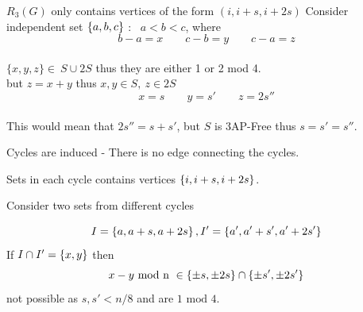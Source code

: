
\begin{frame}
    \begin{heading}{\(R_3(G)\) only contains vertices of the form \((i, i+s, i+2s)\)}
        Consider independent set \(\left\{ a,b,c \right\}\) : \ \(a<b<c\), where
        \[b-a=x \qquad c-b=y \qquad c-a=z\]\\
        \(\{x,y,z\} \in \ S \cup 2S\) thus they are either 1 or 2 mod 4.\\
        but \(z=x+y\) thus \(x,y \in S, \ z \in 2S\)  \\
        \pause
        \[x=s \qquad y=s' \qquad z=2s''\]\\
        This would mean that \(2s''=s+s'\), but \(S\) is 3AP-Free thus \(s=s'=s''\).
    \end{heading}
\end{frame}


\begin{frame}{}
\begin{heading}{Cycles are induced - There is no edge connecting the cycles.}

    Sets in each cycle contains vertices 
    \(\left\{ i,i+s, i+2s \right\}\).\\
    
    \vspace{1em}
    
    Consider two sets from different cycles 
    
    \vspace{-1em}
    
    \[I=\left\{ a,a+s,a+2s \right\}, I'=\left\{ a',a'+s', a'+2s' \right\}\]
    If \(I \cap I'=\left\{ x,y \right\}\) then 
    \[x-y \text{ mod n } \in \left\{ \pm s, \pm 2s \right\} \cap \left\{ \pm s', \pm 2s' \right\}\]
    not possible as \(s,s' < n/8\) and are \(1 \text{ mod } 4\).
    \vspace{-0.5em}
    \begin{figure}
        \centering
        
    \end{figure}
    \end{heading}
\end{frame}


